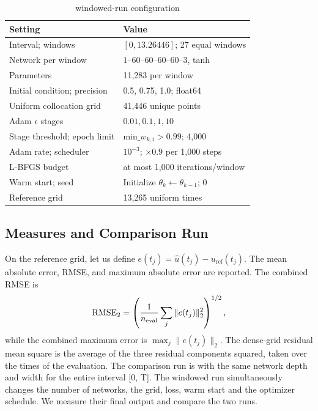 \documentclass[conference]{IEEEtran}
\begin{document}
\begin{table}[t]
\caption{windowed-run configuration}
\label{tab:config}
\centering\footnotesize
\begin{tabular}{ll}
\toprule
Setting & Value\\
\midrule
Interval; windows & $[0,13.26446]$; 27 equal windows\\
Network per window & $1$--$60$--$60$--$60$--$60$--$3$, tanh\\
Parameters & 11,283 per window\\
Initial condition; precision & 0.5, 0.75, 1.0; float64\\
Uniform collocation grid & 41,446 unique points\\
Adam $\epsilon$ stages & $0.01,0.1,1,10$\\
Stage threshold; epoch limit & min$\_w_{k,i}>0.99$; 4,000\\
Adam rate; scheduler & $10^{-3}$; $\times0.9$ per 1,000 steps\\
L-BFGS budget & at most 1,000 iterations/window\\
Warm start; seed & Initialize $\theta_k\gets\theta_{k-1}$; 0\\
Reference grid & 13,265 uniform times\\
\bottomrule
\end{tabular}
\end{table}

\subsection{Measures and Comparison Run}
On the reference grid, let us define $e(t_j)=\hat{u}(t_j)-u_{\mathrm{ref}}(t_j)$. The mean absolute error, RMSE, and maximum absolute error are reported. The combined RMSE is
\begin{equation}
\operatorname{RMSE}_{2}=\left(\frac{1}{n_{\rm eval}}\sum_j\|e(t_j)\|_2^2\right)^{1/2},
\label{eq:rmse}
\end{equation}
while the combined maximum error is $\max_j\|e(t_j)\|_2$. 
The dense-grid residual mean square is the average of the three residual components squared, taken over the times of the evaluation. The comparison run is with the same network depth and width for the entire interval [0, T]. The windowed run simultaneously changes the number of networks, the grid, loss, warm start and
the optimizer schedule. We measure their final output and compare the two runs.
\end{document}
